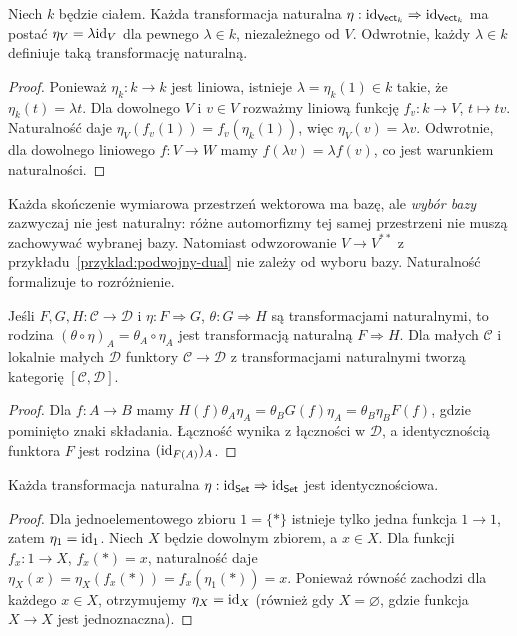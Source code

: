 \begin{twierdzenie}\label{tw:skalarnosc}
Niech $k$ będzie ciałem. Każda transformacja naturalna $\eta:\mathrm{id}_{\mathsf{Vect}_k}\Rightarrow\mathrm{id}_{\mathsf{Vect}_k}$ ma postać $\eta_V=\lambda\mathrm{id}_V$ dla pewnego $\lambda\in k$, niezależnego od $V$. Odwrotnie, każdy $\lambda\in k$ definiuje taką transformację naturalną.
\end{twierdzenie}
\begin{proof}
Ponieważ $\eta_k:k\to k$ jest liniowa, istnieje $\lambda=\eta_k(1)\in k$ takie, że $\eta_k(t)=\lambda t$. Dla dowolnego $V$ i $v\in V$ rozważmy liniową funkcję $f_v:k\to V$, $t\mapsto tv$. Naturalność daje $\eta_V(f_v(1))=f_v(\eta_k(1))$, więc $\eta_V(v)=\lambda v$. Odwrotnie, dla dowolnego liniowego $f:V\to W$ mamy $f(\lambda v)=\lambda f(v)$, co jest warunkiem naturalności.
\end{proof}

\begin{uwaga}
Każda skończenie wymiarowa przestrzeń wektorowa ma bazę, ale \emph{wybór bazy} zazwyczaj nie jest naturalny: różne automorfizmy tej samej przestrzeni nie muszą zachowywać wybranej bazy. Natomiast odwzorowanie $V\to V^{**}$ z przykładu~\ref{przyklad:podwojny-dual} nie zależy od wyboru bazy. Naturalność formalizuje to rozróżnienie.
\end{uwaga}

\begin{stwierdzenie}
Jeśli $F,G,H:\mathcal C\to\mathcal D$ i $\eta:F\Rightarrow G$, $\theta:G\Rightarrow H$ są transformacjami naturalnymi, to rodzina $(\theta\circ\eta)_A=\theta_A\circ\eta_A$ jest transformacją naturalną $F\Rightarrow H$. Dla małych $\mathcal C$ i lokalnie małych $\mathcal D$ funktory $\mathcal C\to\mathcal D$ z transformacjami naturalnymi tworzą kategorię $[\mathcal C,\mathcal D]$.
\end{stwierdzenie}
\begin{proof}
Dla $f:A\to B$ mamy $H(f)\theta_A\eta_A=\theta_B G(f)\eta_A=\theta_B\eta_B F(f)$, gdzie pominięto znaki składania. Łączność wynika z łączności w $\mathcal D$, a identycznością funktora $F$ jest rodzina $(\mathrm{id}_{F(A)})_A$.
\end{proof}


\begin{twierdzenie}\label{tw:only-id-set}
Każda transformacja naturalna $\eta:\mathrm{id}_{\mathsf{Set}}\Rightarrow\mathrm{id}_{\mathsf{Set}}$ jest identycznościowa.
\end{twierdzenie}
\begin{proof}
Dla jednoelementowego zbioru $1=\{*\}$ istnieje tylko jedna funkcja $1\to1$, zatem $\eta_1=\mathrm{id}_1$. Niech $X$ będzie dowolnym zbiorem, a $x\in X$. Dla funkcji $f_x:1\to X$, $f_x(*)=x$, naturalność daje $\eta_X(x)=\eta_X(f_x(*))=f_x(\eta_1(*))=x$. Ponieważ równość zachodzi dla każdego $x\in X$, otrzymujemy $\eta_X=\mathrm{id}_X$ (również gdy $X=\varnothing$, gdzie funkcja $X\to X$ jest jednoznaczna).
\end{proof}

